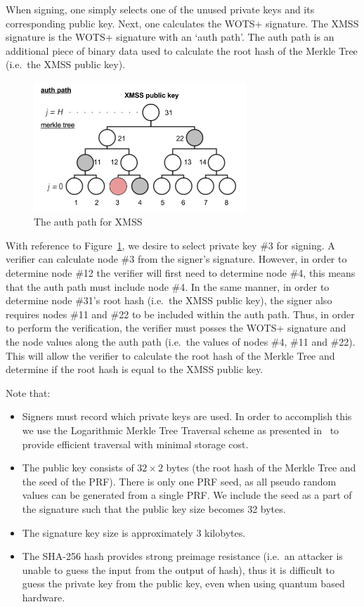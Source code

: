 \documentclass[a4paper,10pt,twocolumn]{article}
\begin{document}
When signing, one simply selects one of the unused private keys and its corresponding public key. Next, one calculates the WOTS+ signature. The 
XMSS signature is the WOTS+ signature with an `auth path'. The auth path is an additional piece of binary data used to calculate the 
root hash of the Merkle Tree (i.e.\ the XMSS public key).

\begin{figure}[ht]
	\begin{center}
	\includegraphics[width=80mm]{auth_path.png}
	  \caption{The auth path for XMSS}
    \label{fig:xmss_auth}
	\end{center}
 \end{figure}

With reference to Figure~\ref{fig:xmss_auth}, we desire to select private key \#3 for signing. A verifier can calculate node \#3 from the 
signer's signature. However, in order to determine node \#12 the verifier will first need to determine node \#4, this means that the auth 
path must include node \#4. In the same manner, in order to determine node \#31's root hash (i.e.\ the XMSS public key), the signer also 
requires nodes \#11 and \#22 to be included within the auth path. Thus, in order to perform the verification, the verifier must posses the 
WOTS+ signature and the node values along the auth path (i.e.\ the values of nodes \#4, \#11 and \#22). This will allow the verifier to 
calculate the root hash of the Merkle Tree and determine if the root hash is equal to the XMSS public key.

Note that:
\vspace{-0.5\baselineskip}
\begin{itemize}
	\setlength\itemsep{0em}
	\item Signers must record which private keys are used. In order to accomplish this we use the Logarithmic Merkle Tree Traversal 
	scheme as presented in~\cite{traverse} to provide efficient traversal with minimal storage cost. \item The public key consists of 
	\(32 \times 2 \) bytes (the root hash of the Merkle Tree and the seed of the PRF). There is only one PRF seed, as all pseudo random 
	values can be generated from a single PRF\@. We include the seed as a part of the signature such that the public key size becomes 
	32 bytes. \item  The signature key size is approximately 3 kilobytes. \item The SHA-256 hash provides strong preimage resistance 
	(i.e.\ an attacker is unable to guess the input from the output of hash), thus it is difficult to guess the private key from the public key, even when using quantum based hardware.
\end{itemize}
		
\end{document}
